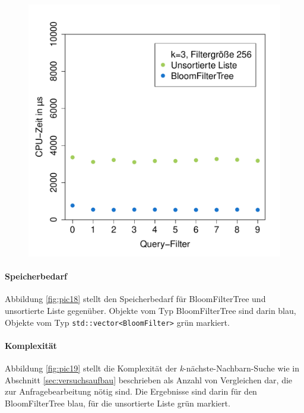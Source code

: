 \begin{figure}[hptb]
	\hspace{0.01\textwidth}
	\includegraphics[width=0.48\linewidth]{pictures/cputime_nn3_256.pdf}
\end{figure}
\paragraph*{Speicherbedarf}
Abbildung \ref{fig:pic18} stellt den Speicherbedarf für BloomFilterTree und unsortierte Liste gegenüber. Objekte vom Typ BloomFilterTree sind darin blau, Objekte vom Typ \texttt{std::vector<BloomFilter>} grün markiert. 
\paragraph*{Komplexität}
Abbildung \ref{fig:pic19} stellt die Komplexität der \textit{k}-nächste-Nachbarn-Suche wie in Abschnitt \ref{sec:versuchsaufbau} beschrieben als Anzahl von Vergleichen dar, die zur Anfragebearbeitung nötig sind. Die Ergebnisse sind darin für den BloomFilterTree blau, für die unsortierte Liste grün markiert.
